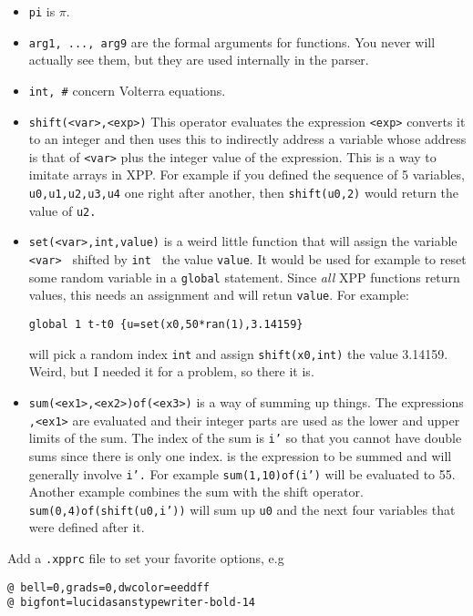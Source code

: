 \begin{itemize}
\item {\tt  pi}  is $\pi.$ 
\item {\tt arg1, ..., arg9} are the formal arguments for functions. You never will actually see them, but they are used internally in the parser. 
\item {\tt int, \#} concern Volterra equations.
\item {\tt shift(<var>,<exp>)} This operator evaluates the expression
{\tt <exp>} converts it to an integer and then uses this to indirectly
address a variable whose address is that of {\tt <var>} plus the
integer value of the expression.  This is a way to imitate arrays in
XPP.  For example if you defined the sequence of 5 variables, {\tt
u0,u1,u2,u3,u4} one right after another, then {\tt shift(u0,2)} would
return the value of {\tt u2.} 
\item {\tt set(<var>,int,value)}  is a weird little function that will assign the variable {\tt <var> } shifted by {\tt int } the value {\tt value}.  It would be used for example to reset some random variable in a {\tt global} statement. Since {\em all} XPP functions return values, this needs an assignment and will retun {\tt value}.  For example:
\begin{verbatim}
global 1 t-t0 {u=set(x0,50*ran(1),3.14159}
\end{verbatim}
will pick a random index {\tt int} and assign {\tt shift(x0,int)} the value 3.14159.  Weird, but I needed it for a problem, so there it is.
\item {\tt sum(<ex1>,<ex2>)of(<ex3>)} is a way of summing up things.
The expressions {\tt <ex1>,<ex1>} are evaluated and their integer
parts are used as the lower and upper limits of the sum.  The index of
the sum is {\tt i'} so that you cannot have double sums since there is
only one index.  {\tt <ex3>} is the expression to be summed and will
generally involve {\tt i'.}  For example  {\tt sum(1,10)of(i')} will
be evaluated to 55.  Another example combines the sum with the shift
operator.  {\tt sum(0,4)of(shift(u0,i'))} will sum up {\tt u0} and the
next four variables that were defined after it.  
\end{itemize}




\medskip
\noindent Add a {\tt .xpprc} file to set your favorite options, e.g
\begin{verbatim}
@ bell=0,grads=0,dwcolor=eeddff
@ bigfont=lucidasanstypewriter-bold-14
\end{verbatim}

\medskip

